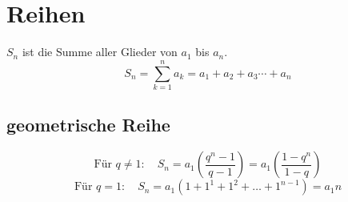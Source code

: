 \section{Reihen}
$S_n$ ist die Summe aller Glieder von $a_1$ bis $a_n$. 
\[ \boxed{S_n = \sum_{k=1}^{n} a_k = a_1 + a_2 + a_3 \cdots + a_n} \]


\subsection{geometrische Reihe}
\[ \boxed{\text{Für } q \neq 1: \quad S_n = a_1 (  \frac{q^n - 1}{q - 1} ) = a_1 (  \frac{1 - q^n}{1 - q} )} \]
\[ \boxed{\text{Für } q = 1: \quad S_n = a_1 (1+1^1 + 1^2 + \ldots + 1^{n-1}) = a_1 n} \]